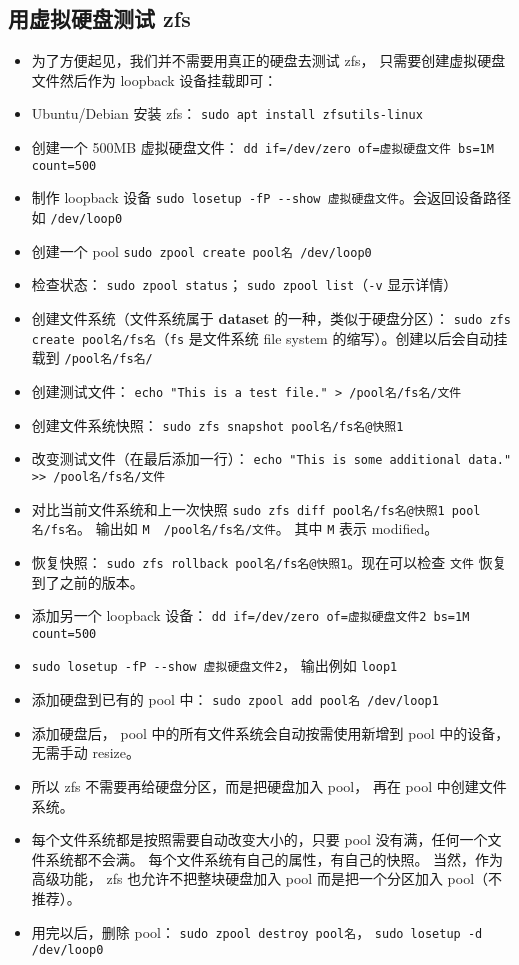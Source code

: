 \subsection{用虚拟硬盘测试 zfs}\label{sub_ZFS_1}
\begin{itemize}
\item 为了方便起见，我们并不需要用真正的硬盘去测试 zfs， 只需要创建虚拟硬盘文件然后作为 loopback 设备挂载即可：
\item Ubuntu/Debian 安装 zfs： \verb|sudo apt install zfsutils-linux|
\item 创建一个 500MB 虚拟硬盘文件： \verb|dd if=/dev/zero of=虚拟硬盘文件 bs=1M count=500|
\item 制作 loopback 设备 \verb|sudo losetup -fP --show 虚拟硬盘文件|。会返回设备路径如 \verb|/dev/loop0|
\item 创建一个 pool \verb|sudo zpool create pool名 /dev/loop0|
\item 检查状态： \verb|sudo zpool status|； \verb|sudo zpool list|（\verb|-v| 显示详情）
\item 创建文件系统（文件系统属于 \textbf{dataset} 的一种，类似于硬盘分区）： \verb|sudo zfs create pool名/fs名|（\verb|fs| 是文件系统 file system 的缩写）。创建以后会自动挂载到 \verb`/pool名/fs名/`
\item 创建测试文件： \verb|echo "This is a test file." > /pool名/fs名/文件|
\item 创建文件系统快照： \verb|sudo zfs snapshot pool名/fs名@快照1|
\item 改变测试文件（在最后添加一行）： \verb|echo "This is some additional data." >> /pool名/fs名/文件|
\item 对比当前文件系统和上一次快照 \verb|sudo zfs diff pool名/fs名@快照1 pool名/fs名|。 输出如 \verb|M	/pool名/fs名/文件|。 其中 \verb|M| 表示 modified。
\item 恢复快照： \verb|sudo zfs rollback pool名/fs名@快照1|。现在可以检查 \verb|文件| 恢复到了之前的版本。
\item 添加另一个 loopback 设备： \verb|dd if=/dev/zero of=虚拟硬盘文件2 bs=1M count=500|
\item \verb|sudo losetup -fP --show 虚拟硬盘文件2|， 输出例如 \verb|loop1|
\item 添加硬盘到已有的 pool 中： \verb|sudo zpool add pool名 /dev/loop1|
\item 添加硬盘后， pool 中的所有文件系统会自动按需使用新增到 pool 中的设备，无需手动 resize。
\item 所以 zfs 不需要再给硬盘分区，而是把硬盘加入 pool， 再在 pool 中创建文件系统。
\item 每个文件系统都是按照需要自动改变大小的，只要 pool 没有满，任何一个文件系统都不会满。
每个文件系统有自己的属性，有自己的快照。 当然，作为高级功能， zfs 也允许不把整块硬盘加入 pool 而是把一个分区加入 pool（不推荐）。
\item 用完以后，删除 pool： \verb|sudo zpool destroy pool名|， \verb|sudo losetup -d /dev/loop0|
\end{itemize}

